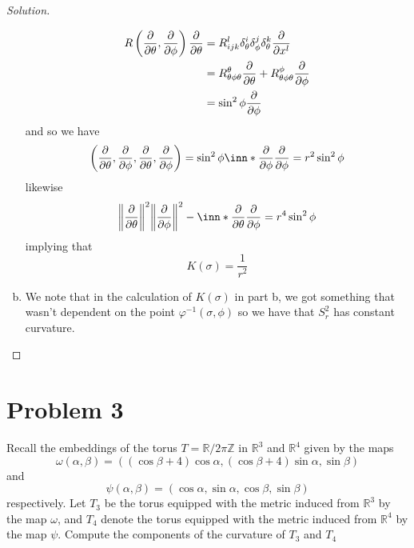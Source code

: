 \documentclass[a4paper]{article}
\begin{document}
\begin{proof}[Solution]
\begin{enumerate}[(a)]
\[\begin{aligned}
      R \left(\pdv{\theta}, \pdv{\phi} \right)\pdv{\theta} &= R_{ijk}^l \delta^{i}_\theta \delta^j_\phi \delta^k_\theta \pdv{x^l}\\
                                                           &= R_{\theta \phi \theta}^\theta \pdv{\theta} + R_{\theta \phi \theta}^\phi \pdv{\phi} \\
                                                           &= \sin^2 \phi \pdv{\phi}
    \end{aligned}
  \]
  and so we have
  \[
    \left( \pdv{\theta}, \pdv{\phi}, \pdv{\theta}, \pdv{\phi} \right) = \sin^2 \phi \inn*{\pdv{\phi}}{\pdv{\phi}} = r^2 \sin^2 \phi
  \]
  likewise
  \[
    \norm{\pdv{\theta}}^2 \norm{\pdv{\phi}}^2 - \inn*{\pdv{\theta}}{\pdv{\phi}} = r^4 \sin^2 \phi
  \]
  implying that
  \[
    K(\sigma) = \frac{1}{r^2}
  \]
  \item We note that in the calculation of $K(\sigma)$ in part b, we got something that wasn't dependent on the point $\varphi^{-1}(\sigma, \phi)$ so we have that $S_r^2$ has constant curvature.
  \end{enumerate}
\end{proof}

\section*{Problem 3}%
Recall the embeddings of the torus $T = \mathds{R}/2\pi \mathds{Z}$ in $\mathds{R}^3$ and $\mathds{R}^4$ given by the maps
\[
  \omega(\alpha, \beta) = ((\cos \beta + 4) \cos \alpha, (\cos \beta + 4) \sin \alpha, \sin \beta)
\]
and
\[
  \psi(\alpha, \beta) = (\cos \alpha, \sin \alpha, \cos \beta, \sin \beta)
\]
respectively. Let $T_3$ be the torus equipped with the metric induced from $\mathds{R}^3$ by the map $\omega$, and $T_4$ denote the torus equipped with the metric induced from $\mathds{R}^4$ by the map $\psi$. Compute the components of the curvature of $T_3$ and $T_4$
\end{document}

